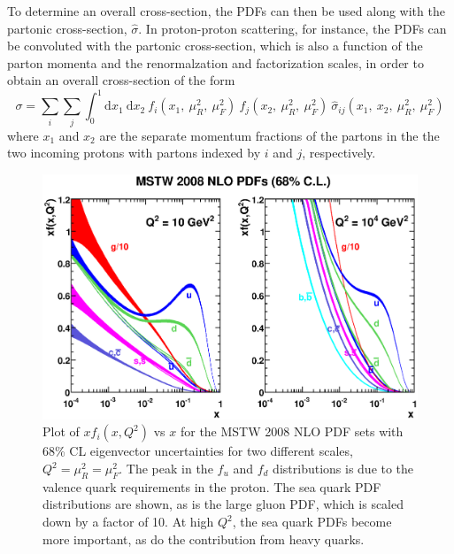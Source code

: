 To determine an overall cross-section, 
the PDFs can then be used along with the partonic cross-section,
$\hat{\sigma}$.
In proton-proton scattering, for instance, 
the PDFs can be convoluted with the partonic
cross-section, which is also 
a function of the parton momenta and the renormalzation and factorization
scales, in order to obtain an overall cross-section of the form
\begin{equation}
\sigma = \sum_i \sum_j \int^1_0 \textrm{d}x_1~\textrm{d}x_2~f_i(x_1,~\mu_R^2,~\mu_F^2)~f_j(x_2,~\mu_R^2,~\mu_F^2) ~\hat{\sigma}_{ij}(x_1,~x_2,~\mu_R^2,~\mu_F^2)
\label{eq:qcd_fac}
\end{equation}
where $x_1$ and $x_2$ are the separate momentum fractions of the partons in the 
the two incoming protons with partons indexed by $i$ and $j$, respectively.


\begin{figure}[ht]
\centering
\includegraphics[width=.9\textwidth]{figures/theory/mstw.eps}
\caption{Plot of $xf_i(x,Q^2)$ vs $x$ for the MSTW 2008 NLO PDF sets \cite{Martin:2009iq} with 68\% CL 
eigenvector uncertainties for two different scales, $Q^2=\mu_R^2=\mu_F^2$.
The peak in the $f_u$ and $f_d$ distributions is due to the valence
quark requirements in the proton. The sea quark PDF distributions are shown,
as is the large gluon PDF, which is scaled down by a factor of 10.  At
high $Q^2$, the sea quark PDFs become more important, as do the 
contribution from heavy quarks.}
\label{fig:pdf_mstw}
\end{figure}


